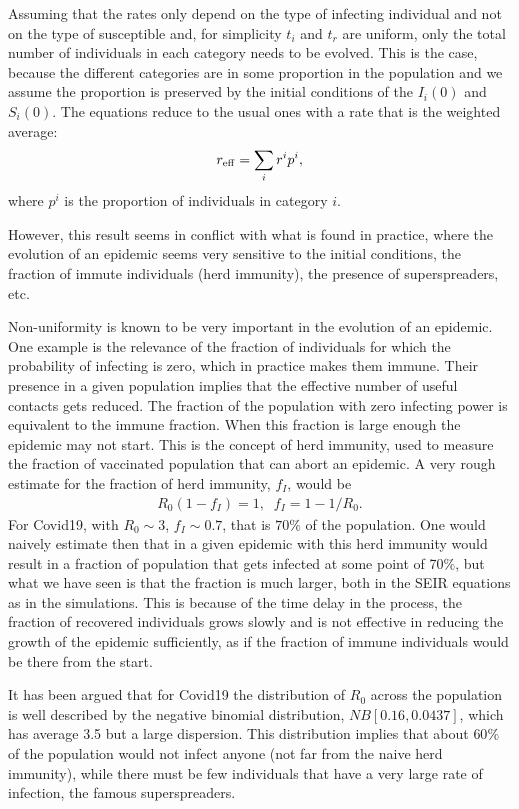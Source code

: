 \documentclass[a4paper,oneside,11pt]{article}
\begin{document}
Assuming that the rates only depend on the type of infecting individual and not on the type of susceptible and, for simplicity $t_i$ and $t_r$ are uniform, only the total number of individuals in each category needs to be evolved. This is the case, because the different categories are in some proportion in the population and we assume the proportion is preserved by
 the initial conditions of the $I_i(0)$ and $S_i(0)$. The equations reduce to the usual ones with a rate that is the weighted average:
 \begin{eqnarray}
 r_{\rm eff} = \sum_i r^i p^i,
 \end{eqnarray}
 where $p^i$ is the proportion of individuals in category $i$.
 
 However, this result seems in conflict with what is found in practice, where the evolution of an epidemic seems very sensitive to the initial conditions, the fraction of immute individuals (herd immunity), the presence of superspreaders, etc. 

Non-uniformity is known to be very important in the evolution of an epidemic. One example is the relevance of the fraction of individuals for which the probability of infecting is zero, which in practice makes them immune. Their presence in a given population implies that the effective number of useful contacts gets reduced. The fraction of the population with zero infecting power is equivalent to the immune fraction. When this fraction is large enough  the epidemic may not start. This is the concept of herd immunity, used to measure the fraction of vaccinated population that can abort an epidemic. A very rough estimate for the fraction of herd immunity, $f_I$, would be
   \begin{eqnarray}
  R_0 (1- f_I)  =1, \;\; f_I= 1-1/R_0. 
   \end{eqnarray} 
   For Covid19, with $R_0 \sim 3$, $f_I \sim 0.7$, that is $70\%$ of the population. One would naively estimate then that in a given epidemic with this herd immunity would result in a 
 fraction of  population that gets infected at some point of 70$\%$, but what we have seen is that the fraction is much larger, both in the SEIR equations as in the simulations. This is because of the time delay in the process, the fraction of recovered individuals grows slowly and is not effective in reducing the growth of the epidemic sufficiently, as if the fraction of immune individuals would be there from the start. 
 
  It has been argued that for Covid19 the distribution of $R_0$ across the population is well described by the negative binomial distribution, $NB[0.16,0.0437]$, which has average 3.5 but a large dispersion. This distribution implies that about $60\%$ of the population would not infect anyone (not far from the naive herd immunity), while there must be few individuals that have a very large rate of infection, the famous superspreaders. 
  
\end{document}
